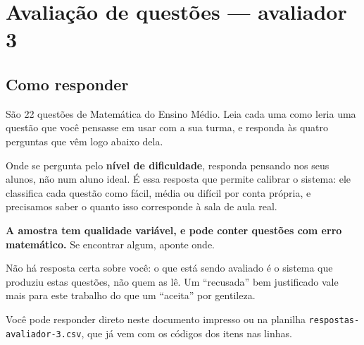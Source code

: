 \documentclass[11pt,a4paper]{article}
\begin{document}
\section*{Avaliação de questões --- avaliador 3}
\subsection*{Como responder}

São 22 questões de Matemática do Ensino Médio. Leia cada uma como leria uma
questão que você pensasse em usar com a sua turma, e responda às quatro
perguntas que vêm logo abaixo dela.

Onde se pergunta pelo \textbf{nível de dificuldade}, responda pensando nos
seus alunos, não num aluno ideal. É essa resposta que permite calibrar o
sistema: ele classifica cada questão como fácil, média ou difícil por conta
própria, e precisamos saber o quanto isso corresponde à sala de aula real.

\textbf{A amostra tem qualidade variável, e pode conter questões com erro
matemático.} Se encontrar algum, aponte onde.

Não há resposta certa sobre você: o que está sendo avaliado é o sistema que
produziu estas questões, não quem as lê. Um ``recusada'' bem justificado vale
mais para este trabalho do que um ``aceita'' por gentileza.

Você pode responder direto neste documento impresso ou na planilha
\texttt{respostas-avaliador-3.csv}, que já vem com os códigos dos itens nas linhas.
\end{document}
